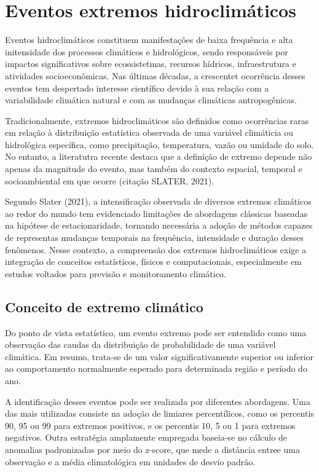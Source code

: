 \section{Eventos extremos hidroclimáticos}\label{sec:eventos-extremos}

	Eventos hidroclimáticos constituem manifestações de baixa frequência e alta initensidade dos processos climáticos e hidrológicos, sendo responsáveis por impactos significativos sobre ecossistetmas, recursos hídricos, infraestrutura e atividades socioeconômicas.
	Nas últimas décadas, a crescentet ocorrência desses eventos tem despertado interesse científico devido à sua relação com a variabilidade climática natural e com as mudanças climáticas antropogênicas.

	Tradicionalmente, extremos hidroclimáticos são definidos como ocorrências raras em relação à distribuição estatística observada de uma variável climáticia ou hidrológica específica, como precipitação, temperatura, vazão ou umidade do solo.
	No entanto, a literatutra recente destaca que a definição de extremo depende não apenas da magnitude do evento, mas também do contexto espacial, temporal e socioambiental em que ocorre (citação SLATER, 2021).

	Segundo Slater (2021), a intensificação observada de diversos extremos climáticos ao redor do mundo tem evidenciado limitações de abordagens clássicas baseadas na hipótese de estacionaridade, tornando necessária a adoção de métodos capazes de representas mudanças temporais na frequência, intensidade e duração desses fenômenos.
	Nesse contexto, a compreensão dos extremos hidroclimáticos exige a integração de conceitos estatísticos, físicos e computacionais, especialmente em estudos voltados para previsão e monitoramento climático.

\subsection{Conceito de extremo climático}\label{sec:conceito-extremo}

	Do ponto de vista estatístico, um evento extremo pode ser entendido como uma observação das caudas da distribuição de probabilidade de uma variável climática. Em resumo, trata-se de um valor significativamente superior ou inferior ao comportamento normalmente esperado para determinada região e período do ano.

	A identificação desses eventos pode ser realizada por diferentes abordagens. 
	Uma das mais utilizadas consiste na adoção de limiares percentílicos, como os percentis 90, 95 ou 99 para extremos positivos, e os percentis 10, 5 ou 1 para extremos negativos.
	Outra estratégia amplamente empregada baseia-se no cálculo de anomalias padronizadas por meio do z-score, que mede a distância entree uma observação e a média climatológica em unidades de desvio padrão.

